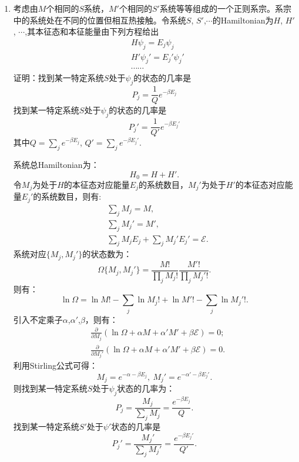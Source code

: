 \documentclass[reqno,a4paper,12pt]{amsart}
\begin{document}
\begin{enumerate}[1]
	\item 考虑由$M$个相同的$S$系统，$M'$个相同的$S'$系统等等组成的一个正则系宗。系宗中的系统处在不同的位置但相互热接触。令系统$S$, $S'$,$\cdots$的Hamiltonian为$H$, $H'$, $\cdots$,其本征态和本征能量由下列方程给出
	\begin{align*}
		&H\psi_j = E_j\psi_j \\
		&H'\psi_j' = E_j'\psi_j' \\
		&\cdots \cdots
	\end{align*}
	证明：找到某一特定系统$S$处于$\psi_j$的状态的几率是
	\[
		P_j = \frac{1}{Q}e^{-\beta E_j}
	\]
	找到某一特定系统$S$处于$\psi_j$的状态的几率是
	\[
		P_j' = \frac{1}{Q'}e^{-\beta E_j'}
	\]
	其中$Q = \sum_j e^{-\beta E_j}$, $Q' = \sum_j e^{-\beta E_j'}$.
	\begin{tcolorbox}[breakable, colback = black!5!white, colframe = black]
	系统总Hamiltonian为：
	\[
		H_0 = H + H'.
	\]
	令$M_j$为处于$H$的本征态对应能量$E_j$的系统数目，$M_j'$为处于$H'$的本征态对应能量$E_j'$的系统数目，则有:
	\begin{align*}
		&\sum_j M_j = M, \\
		&\sum_j M_j' = M', \\
		&\sum_j M_jE_j + \sum_j M_j'E_j' = \mathcal{E}.
	\end{align*}
	系统对应$\{ M_j, M_j' \}$的状态数为：
	\[
		\Omega\{ M_j, M_j' \} = \frac{M!}{\prod_j M_j!}\frac{M'!}{\prod_jM_j'!}.
	\]
	则有：
	\[
		\ln \Omega = \ln M! - \sum_j \ln M_j! + \ln M'! - \sum_j \ln M_j'!.
	\]
	引入不定乘子$\alpha$,$\alpha'$,$\beta$，则有：
	\begin{align*}
		&\frac{\partial}{\partial M_j} \left( \ln \Omega + \alpha M + \alpha' M' + \beta \mathcal{E} \right) = 0; \\ 
		&\frac{\partial}{\partial M_j'} \left( \ln \Omega + \alpha M + \alpha' M' + \beta \mathcal{E} \right) = 0.
	\end{align*}
	利用Stirling公式可得：
	\[
		M_j = e^{-\alpha-\beta E_j}, ~ M_j' = e^{-\alpha'-\beta E_j'}.
	\]
	则找到某一特定系统$S$处于$\psi_j$状态的几率为：
	\[
		P_j = \frac{M_j}{\sum_j M_j} = \frac{e^{-\beta E_j}}{Q}.
	\]
	找到某一特定系统$S'$处于$\psi'$状态的几率是
	\[
		P_j' = \frac{M_j'}{\sum_j M_j'} = \frac{e^{-\beta E_j'}}{Q'}.
	\]
	\end{tcolorbox}
	

\end{enumerate}
\end{document}

